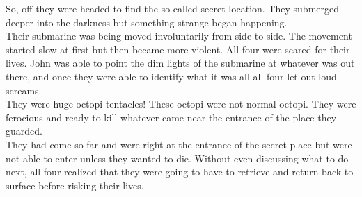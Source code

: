 \documentclass{article}
\begin{document}
So, off they were headed to find the so-called secret location. They submerged
deeper into the darkness but something strange began happening. \\

Their submarine was being moved involuntarily from side to side. The movement
started slow at first but then became more violent. All four were scared for
their lives. John was able to point the dim lights of the submarine at whatever
was out there, and once they were able to identify what it was all all four let
out loud screams. \\

They were huge octopi tentacles! These octopi were not normal octopi. They were
ferocious and ready to kill whatever came near the entrance of the place they guarded.\\

They had come so far and were right at the entrance of the secret place but were
not able to enter unless they wanted to die. Without even discussing what to do
next, all four realized that they were going to have to retrieve and return back
to surface before risking their lives. 
\end{document}
